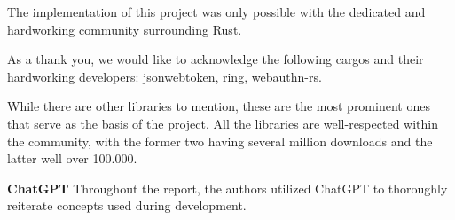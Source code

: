 The implementation of this project was only possible with the dedicated and
hardworking community surrounding Rust.

As a thank you, we would like to acknowledge the following cargos and their
hardworking developers:
\href{https://crates.io/crates/jsonwebtoken}{jsonwebtoken},
\href{https://crates.io/crates/ring}{ring},
\href{https://crates.io/crates/webauthn-rs}{webauthn-rs}.

While there are other libraries to mention, these are the most prominent ones
that serve as the basis of the project.
All the libraries are well-respected within the community, with the former two
having several million downloads and the latter well over 100.000.

\textbf{ChatGPT}
Throughout the report, the authors utilized ChatGPT to thoroughly reiterate
concepts used during development.
